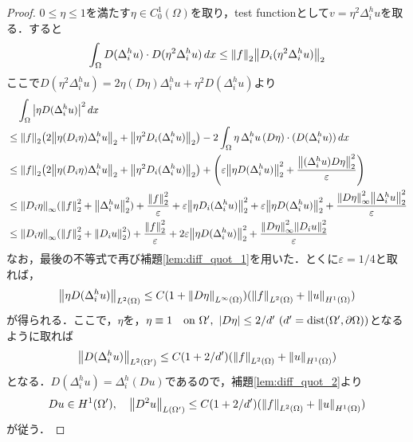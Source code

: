 \documentclass[a4paper]{ltjsarticle}
\newcommand{\Om}{\Omega}
\newcommand{\pOm}{\partial\Omega}
\newcommand{\on}{\quad \text{on}\ }
\newcommand{\1}{\mathbbm{1}}
\DeclareMathOperator{\dist}{\mathrm{dist}}
\numberwithin{equation}{section}
\theoremstyle{definition}
\begin{document}
\begin{proof}
    $0\leq \eta\leq 1$を満たす$\eta\in C^1_0(\Om)$を取り，test functionとして$v=\eta^2\Delta^h_i u$を取る．すると
    \begin{equation}
        \int_{\Om}D(\Delta^h_iu)\cdot D(\eta^2\Delta^h_iu)\,dx\leq \norm{f}_2\norm{D_i(\eta^2 \Delta^h_i u)}_{2}
    \end{equation}
    ここで$D(\eta^2\Delta^h_iu)=2\eta (D\eta)\Delta^h_i u+\eta^2D(\Delta^h_iu)$より 
    \begin{align}
        &\quad\int_{\Om}\abs{\eta D(\Delta^h_iu)}^2\,dx\\
        &\leq \norm{f}_2\qty(2\norm{\eta(D_i\eta)\Delta^h_iu}_2+\norm{\eta^2 D_i(\Delta^h_iu)}_2)-2\int_{\Om}\eta\,\Delta^h_iu\,(D\eta)\cdot (D(\Delta^h_iu))\,dx\\
        &\leq \norm{f}_2\qty(2\norm{\eta(D_i\eta)\Delta^h_iu}_2+\norm{\eta^2 D_i(\Delta^h_iu)}_2)+\qty(\varepsilon\norm{\eta D(\Delta^h_i u)}_2^2+\frac{\norm{(\Delta^h_iu)D\eta}_2^2}{\varepsilon})\\
        &\leq \norm{D_i\eta}_\infty(\norm{f}_2^2+\norm{\Delta^h_iu}_2^2)+\frac{\norm{f}_2^2}{\varepsilon}+\varepsilon\norm{\eta D_i(\Delta^h_iu)}_2^2+\varepsilon\norm{\eta D(\Delta^h_iu)}_2^2+\frac{\norm{D\eta}_\infty^2\norm{\Delta^h_i u}_2^2}{\varepsilon}\\
        &\leq \norm{D_i\eta}_\infty(\norm{f}_2^2+\norm{D_iu}_2^2)+\frac{\norm{f}_2^2}{\varepsilon}+2\varepsilon\norm{\eta D(\Delta^h_iu)}_2^2+\frac{\norm{D\eta}_\infty^2\norm{D_i u}_2^2}{\varepsilon}
    \end{align}
    なお，最後の不等式で再び補題\ref{lem:diff_quot_1}を用いた．とくに$\varepsilon=1/4$と取れば，
    \begin{equation}
        \norm{\eta D(\Delta^h_iu)}_{L^2(\Om)}\leq C(1+\norm{D\eta}_{L^\infty(\Om)})(\norm{f}_{L^2(\Om)}+\norm{u}_{H^1(\Om)})
    \end{equation}
    が得られる．ここで，$\eta$を，$\eta\equiv1\on \Om',\ \abs{D\eta}\leq 2/d'\ (d'=\dist(\Om',\pOm))$となるように取れば
    \begin{equation}
        \norm{D(\Delta^h_iu)}_{L^2(\Om')}\leq C(1+2/d')(\norm{f}_{L^2(\Om)}+\norm{u}_{H^1(\Om)})
    \end{equation}
    となる．$D(\Delta^h_iu)=\Delta^h_i(Du)$であるので，補題\ref{lem:diff_quot_2}より
    \begin{equation}
        Du\in H^1(\Om'),\quad \norm{D^2u}_{L(\Om')}\leq C(1+2/d')(\norm{f}_{L^2(\Om)}+\norm{u}_{H^1(\Om)})
    \end{equation}
    が従う．
\end{proof}
\end{document}
